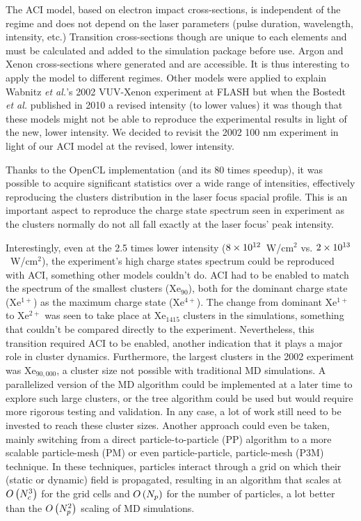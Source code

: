 The ACI model, based on electron impact cross-sections, is independent of the
regime and does not depend on the laser parameters (pulse duration, wavelength,
intensity, etc.) Transition cross-sections though are unique to each elements
and must be calculated and added to the simulation package before use. Argon
and Xenon cross-sections where generated and are accessible. It is thus
interesting to apply the model to different regimes. Other models were applied
to explain Wabnitz \textit{et al.}'s 2002 VUV-Xenon experiment at FLASH but when the
Bostedt \textit{et al.} published in 2010 a revised intensity (to lower values) it was
though that these models might not be able to reproduce the experimental results
in light of the new, lower intensity. We decided to revisit the 2002 100 nm
experiment in light of our ACI model at the revised, lower intensity.

Thanks to the OpenCL implementation (and its 80 times speedup), it was possible
to acquire significant statistics over a wide range of intensities, effectively
reproducing the clusters distribution in the laser focus spacial profile. This
is an important aspect to reproduce the charge state spectrum seen in experiment
as the clusters normally do not all fall exactly at the laser focus' peak
intensity.

Interestingly, even at the 2.5 times lower intensity ($\ten{8}{12}$~W/cm$^{2}$
vs. $\ten{2}{13}$~W/cm$^{2}$), the experiment's high charge states spectrum
could be reproduced with ACI, something other models couldn't do. ACI had to
be enabled to match the spectrum of the smallest clusters (Xe$_{90}$), both
for the dominant charge state (Xe$^{1+}$) as the maximum charge state (Xe$^{4+}$).
The change from dominant Xe$^{1+}$ to Xe$^{2+}$ was seen to take place at
Xe$_{1415}$ clusters in the simulations, something that couldn't be compared
directly to the experiment. Nevertheless, this transition required ACI to be
enabled, another indication that it plays a major role in cluster dynamics.
Furthermore, the largest clusters in the 2002 experiment was Xe$_{90,000}$, a
cluster size not possible with traditional MD simulations. A parallelized
version of the MD algorithm could be implemented at a later time to explore such
large clusters, or the tree algorithm could be used but would require more
rigorous testing and validation. In any case, a lot of work still need to be
invested to reach these cluster sizes. Another approach could even be taken,
mainly switching from a direct particle-to-particle (PP) algorithm to a more
scalable particle-mesh (PM) or even particle-particle, particle-mesh (P3M)
technique. In these techniques, particles interact through a grid on which their
(static or dynamic) field is propagated, resulting in an algorithm that scales
at $O\left( N_c^3 \right)$ for the grid cells and $O\left( N_p \right)$ for the number of particles,
a lot better than the $O\left( N_p^2 \right)$ scaling of MD simulations.

